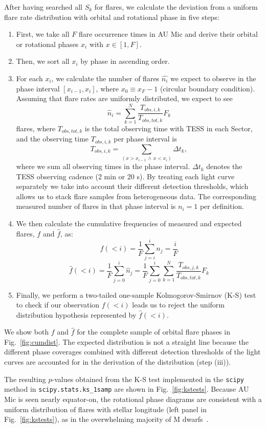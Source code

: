 \documentclass[fleqn,usenatbib,letters]{mnras}%
\begin{document}
After having searched all $S_k$ for flares, we calculate the deviation from a uniform flare rate distribution with orbital and rotational phase in five steps:
\begin{enumerate}
\item First, we take all $F$ flare occurrence times in AU Mic and derive their orbital or rotational phases $x_i$ with $x \in [1,F]$. 
\item Then, we sort all $x_i$ by phase in ascending order.
\item For each $x_i$, we calculate the number of flares $\hat{n_i}$ we expect to observe in the phase interval $[x_{i-1}, x_i]$, where $x_0\equiv x_F - 1$ (circular boundary condition). Assuming that flare rates are uniformly distributed, we expect to see
$$\hat{n}_i = \displaystyle\sum_{k=1}^N\dfrac{T_{obs, i, k}}{T_{obs, tot, k}} F_k$$
flares, where $T_{obs, tot, k}$ is the total observing time with TESS in each Sector, and the observing time $T_{obs,i,k}$ per phase interval is
$$T_{obs,i,k}=\displaystyle\sum_{(x>x_{i-1}\, \land \, x<x_i)} \Delta t_k,$$
where we sum all observing times in the phase interval. $\Delta t_k$ denotes the TESS observing cadence (2 min or 20 s). By treating each light curve separately we take into account their different detection thresholds, which allows us to stack flare samples from heterogeneous data. The corresponding measured number of flares in that phase interval is $n_i=1$ per definition.
\item We then calculate the cumulative frequencies of measured and expected flares, $f$ and $\hat{f}$, as:
$$f(<i) = \dfrac{1}{F}\displaystyle\sum_{j=i}^{i}n_j= \dfrac{i}{F}$$
$$\hat{f}(<i) =  \dfrac{1}{F}\displaystyle\sum_{j=0}^{i}\hat{n}_j = \dfrac{1}{F}\displaystyle\sum_{j=0}^{i}\displaystyle\sum_{k=1}^N\dfrac{T_{obs, j, k}}{T_{obs, tot, k}} F_k$$
\item Finally, we perform a two-tailed one-sample Kolmogorov-Smirnov (K-S) test to check if our observation $f(<i)$ leads us to reject the uniform distribution hypothesis represented by $\hat{f}(<i)$.
\end{enumerate}
We show both $f$ and $\hat{f}$ for the complete sample of orbital flare phases in Fig.~\ref{fig:cumdist}. The expected distribution is not a straight line because the different phase coverages combined with different detection thresholds of the light curves are accounted for in the derivation of the distribution (step (iii)). 

The resulting $p$-values obtained from the K-S test implemented in the \texttt{scipy} method in \texttt{scipy.stats.ks\_1samp} are shown in Fig.~\ref{fig:kstests}. Because AU Mic is seen nearly equator-on, the rotational phase diagrams are consistent with a uniform distribution of flares with stellar longitude (left panel in Fig.~\ref{fig:kstests}), as in the overwhelming majority of M dwarfs~\citep{doyle2018, doyle2019}. 
\end{document}
